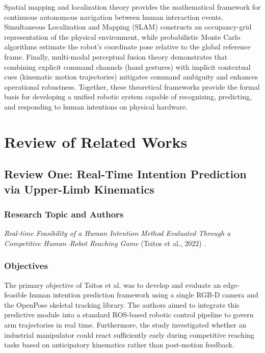 Spatial mapping and localization theory provides the mathematical framework for continuous autonomous navigation between human interaction events. Simultaneous Localization and Mapping (SLAM) constructs an occupancy-grid representation of the physical environment, while probabilistic Monte Carlo algorithms estimate the robot's coordinate pose relative to the global reference frame. Finally, multi-modal perceptual fusion theory demonstrates that combining explicit command channels (hand gestures) with implicit contextual cues (kinematic motion trajectories) mitigates command ambiguity and enhances operational robustness. Together, these theoretical frameworks provide the formal basis for developing a unified robotic system capable of recognizing, predicting, and responding to human intentions on physical hardware.

\section{Review of Related Works}

\subsection{Review One: Real-Time Intention Prediction via Upper-Limb Kinematics}

\subsubsection{Research Topic and Authors}
\textit{Real-time Feasibility of a Human Intention Method Evaluated Through a Competitive Human--Robot Reaching Game} (Tsitos et al., 2022) \cite{tsitos2022}.

\subsubsection{Objectives}
The primary objective of Tsitos et al. was to develop and evaluate an edge-feasible human intention prediction framework using a single RGB-D camera and the OpenPose skeletal tracking library. The authors aimed to integrate this predictive module into a standard ROS-based robotic control pipeline to govern arm trajectories in real time. Furthermore, the study investigated whether an industrial manipulator could react sufficiently early during competitive reaching tasks based on anticipatory kinematics rather than post-motion feedback.

